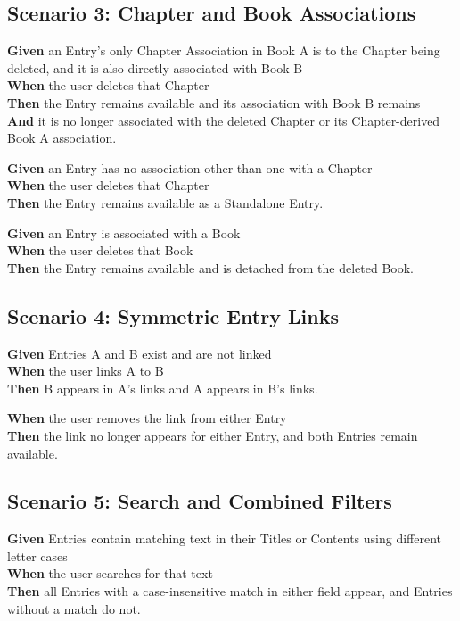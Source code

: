 \documentclass[11pt,a4paper]{article}
\begin{document}
\subsection*{Scenario 3: Chapter and Book Associations}
\textbf{Given} an Entry's only Chapter Association in Book A is to the Chapter being deleted, and it is also directly associated with Book B\\
\textbf{When} the user deletes that Chapter\\
\textbf{Then} the Entry remains available and its association with Book B remains\\
\textbf{And} it is no longer associated with the deleted Chapter or its Chapter-derived Book A association.

\textbf{Given} an Entry has no association other than one with a Chapter\\
\textbf{When} the user deletes that Chapter\\
\textbf{Then} the Entry remains available as a Standalone Entry.

\textbf{Given} an Entry is associated with a Book\\
\textbf{When} the user deletes that Book\\
\textbf{Then} the Entry remains available and is detached from the deleted Book.

\subsection*{Scenario 4: Symmetric Entry Links}
\textbf{Given} Entries A and B exist and are not linked\\
\textbf{When} the user links A to B\\
\textbf{Then} B appears in A's links and A appears in B's links.

\textbf{When} the user removes the link from either Entry\\
\textbf{Then} the link no longer appears for either Entry, and both Entries remain available.

\subsection*{Scenario 5: Search and Combined Filters}
\textbf{Given} Entries contain matching text in their Titles or Contents using different letter cases\\
\textbf{When} the user searches for that text\\
\textbf{Then} all Entries with a case-insensitive match in either field appear, and Entries without a match do not.
\end{document}
